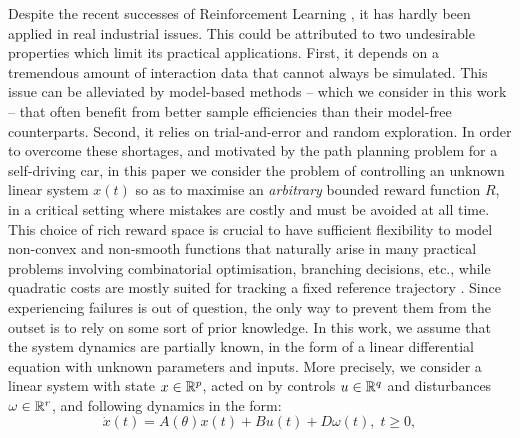 \documentclass{article}
\begin{document}
Despite the recent successes of Reinforcement Learning \citep[e.g.][]{mnih2015humanlevel,Silver1140}, it has hardly been applied in real industrial issues. This could be attributed to two undesirable properties which limit its practical applications. First, it depends on a tremendous amount of interaction data that cannot always be simulated. This issue can be alleviated by model-based methods -- which we consider in this work -- that often benefit from better sample efficiencies than their model-free counterparts. Second, it relies on trial-and-error and random exploration. In order to overcome these shortages, and motivated by the path planning problem for a self-driving car, in this paper we consider the problem of controlling an unknown linear system $x(t)$ so as to maximise an \emph{arbitrary} bounded reward function $R$, in a critical setting where mistakes are costly and must be avoided at all time. 
This choice of rich reward space is crucial to have sufficient flexibility to model non-convex and non-smooth functions that naturally arise in many practical problems involving combinatorial optimisation, branching decisions, etc., while quadratic costs are mostly suited for tracking a fixed reference trajectory \citep[e.g.][]{Kumar2013}.
Since experiencing failures is out of question, the only way to prevent them from the outset is to rely on some sort of prior knowledge. In this work, we assume that the system dynamics are partially known, in the form of a linear differential equation with unknown parameters and inputs. More precisely, we consider a linear system with state $x\in\mathbb{R}^p$, acted on by controls $u\in\mathbb{R}^q$ and disturbances $\omega\in\mathbb{R}^r$, and following dynamics in the form:
\begin{equation}
\label{eq:dynamics}
\dot{x}(t)=A(\theta)x(t) + B u(t) + D \omega(t),\;t\geq0,
\end{equation}
\end{document}
